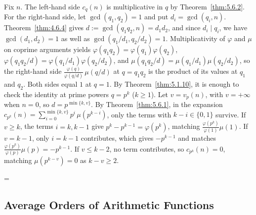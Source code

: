 \documentclass[11pt]{article}
\makeatletter
\theoremstyle{ntstyle}
\let\nt@closedisplay\]
\def\nt@guardedclose{\@ifnextchar\par{\nt@closeafterpar}{\@ifnextchar\end{\postdisplaypenalty\@M\nt@closedisplay}{\nt@closedisplay}}}
\def\nt@closeafterpar\par{\@ifnextchar\par{\nt@closeafterpar}{\@ifnextchar\end{\postdisplaypenalty\@M\nt@closedisplay\par}{\nt@closedisplay\par}}}
\renewenvironment{proof}[1][\proofname]{\par
  \pushQED{\qed}\normalfont\topsep\medskipamount\edef\nt@afterproof{\@endparpenalty=\the\@endparpenalty\relax}\@beginparpenalty\@M\@endparpenalty\@M\let\]\nt@guardedclose\trivlist\item[]\textit{#1\@addpunct{.}} \ignorespaces}{\ifvmode\addpenalty\@M\fi\popQED\nt@afterproof\endtrivlist\@endpefalse}
\makeatother
\begin{document}
\begin{proof} Fix $n$.
The left-hand side $c_q(n)$ is multiplicative in $q$ by Theorem~\ref{thm:5.6.2}.
For the right-hand side, let $\gcd(q_1, q_2) = 1$ and put $d_i = \gcd(q_i, n)$.
Theorem~\ref{thm:4.6.4} gives $d := \gcd(q_1 q_2, n) = d_1 d_2$, and since $d_i \mid q_i$, we have $\gcd(d_1, d_2) = 1$ as well as $\gcd(q_1/d_1, q_2/d_2) = 1$.
Multiplicativity of $\varphi$ and $\mu$ on coprime arguments yields $\varphi(q_1 q_2) = \varphi(q_1)\varphi(q_2)$, $\varphi(q_1 q_2/d) = \varphi(q_1/d_1)\varphi(q_2/d_2)$, and $\mu(q_1 q_2/d) = \mu(q_1/d_1)\mu(q_2/d_2)$,
so the right-hand side $\tfrac{\varphi(q)}{\varphi(q/d)}\,\mu(q/d)$ at $q = q_1 q_2$ is the product of its values at $q_1$ and $q_2$.
Both sides equal
	$1$ at $q = 1$. By Theorem~\ref{thm:5.1.10}, it is enough to
	check the identity at prime powers $q = p^{k}$ ($k \ge 1$). Let $v=v_p(n)$, with $v=+\infty$ when $n=0$, so
	$d=p^{\min\{k,v\}}$. By Theorem~\ref{thm:5.6.1}, in the expansion $c_{p^{k}}(n) = \sum_{i=0}^{\min\{k, v\}}
	p^{i}\, \mu(p^{k-i})$, only the terms with $k - i \in \{0,1\}$ survive. If $v \ge k$,
	the terms $i = k, k-1$ give $p^{k} - p^{k-1} = \varphi(p^{k})$,
	matching $\tfrac{\varphi(p^{k})}{\varphi(1)}\mu(1)$. If $v = k-1$,
	only $i = k-1$ contributes, which gives $-p^{k-1}$ and matches
	$\tfrac{\varphi(p^{k})}{\varphi(p)}\mu(p) = -p^{k-1}$. If $v \le k-2$,
	no term contributes, so $c_{p^{k}}(n) = 0$, matching $\mu(p^{k-v}) = 0$
	as $k - v \ge 2$.

\end{proof}
\subsection{Average Orders of Arithmetic Functions}
\end{document}
